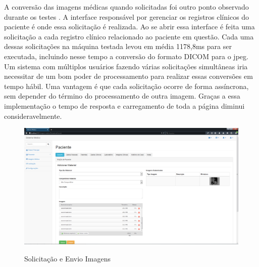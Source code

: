 A conversão das imagens médicas quando solicitadas foi outro ponto observado durante os testes . A interface responsável por gerenciar os registros clínicos do paciente é onde essa solicitação é realizada. Ao se abrir essa interface é feita uma solicitação a cada registro clínico relacionado ao paciente em questão. Cada uma dessas solicitações na máquina testada levou em média 1178,8ms para ser executada, incluindo nesse tempo a conversão do formato DICOM para o jpeg. Um sistema com  múltiplos usuários fazendo várias solicitações simultâneas iria necessitar de um bom poder de processamento para realizar essas conversões em tempo hábil. Uma vantagem é que cada solicitação ocorre de forma assíncrona, sem depender do término do processamento de outra imagem. Graças a essa implementação o tempo de resposta e carregamento de toda a página diminui consideravelmente.

\begin{figure}[ht]
	\centering	
	\caption[\hspace{0.1cm}Imagens Clínicas.]{Solicitação e Envio Imagens}
	\vspace{-0.4cm}
	\includegraphics[width=1.0\textwidth]{figuras/envioMultiplasImagens15mb.png}
	\vspace{-0.2cm}
	\label{fig:figura3}
\end{figure}

